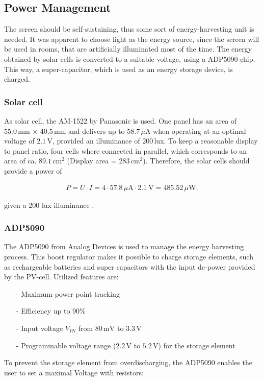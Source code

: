 \subsection{Power Management}
The screen should be self-sustaining, thus some sort of energy-harvesting unit is needed.
It was apparent to choose light as the energy source, since the screen will be used in rooms, that are artificially illuminated most of the time.
The energy  obtained by solar cells is converted to a suitable voltage, using a ADP5090 chip.
This way, a super-capacitor, which is used as an energy storage device, is charged.

\subsubsection{Solar cell}
As solar cell, the AM-1522 by Panasonic is used.
One panel has an area of $55.0\,\text{mm}\,\times\,40.5\,\text{mm}$ and delivers up to $58.7\, \mu\text{A}$ when operating at an optimal voltage of $2.1\,\text{V}$, provided an illuminance of 200\,lux.
To keep a reasonable display to panel ratio, four cells where connected in parallel, which corresponds to an area of ca. $89.1\,\text{cm}^2$ (Display area = $283\,\text{cm}^2$). Therefore, the solar cells should provide a power of

\begin{align}
	P = U\cdot I = 4\cdot 57.8\,\mu\text{A}\cdot 2.1\ \text{V}=485.52\,\mu \text{W},\label{development:cell_power}
\end{align}

given a 200 lux illuminance \cite{amorton}.

\subsubsection{ADP5090}
The ADP5090 from Analog Devices is used to manage the energy harvesting process.
This boost regulator makes it possible to charge storage elements, such as rechargeable batteries and super capacitors with the input dc-power provided by the PV-cell. Utilized features are:
\begin{itemize}
	\item[-] Maximum power point tracking
	\item[-] Efficiency up to 90\%
	\item[-] Input voltage $V_{IN}$ from $80\,\text{mV}$ to $3.3\,\text{V}$
	\item[-] Programmable voltage range ($2.2\,\text{V}$ to $5.2\,\text{V}$) for the storage element
\end{itemize}
To prevent the storage element from overdischarging, the ADP5090 enables the user to set a maximal Voltage with resistors:

